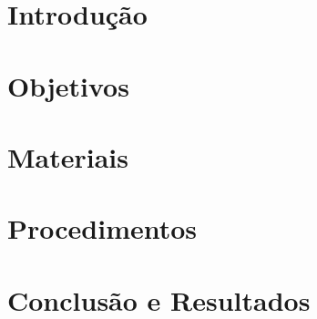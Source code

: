 \documentclass[a4paper, 12pt]{article}
\begin{document}





\section{Introdução}

\section{Objetivos}

\section{Materiais}

\section{Procedimentos}

\section{Conclusão e Resultados}

\clearpage

\printbibliography[heading=bibintoc]    %
\end{document}
